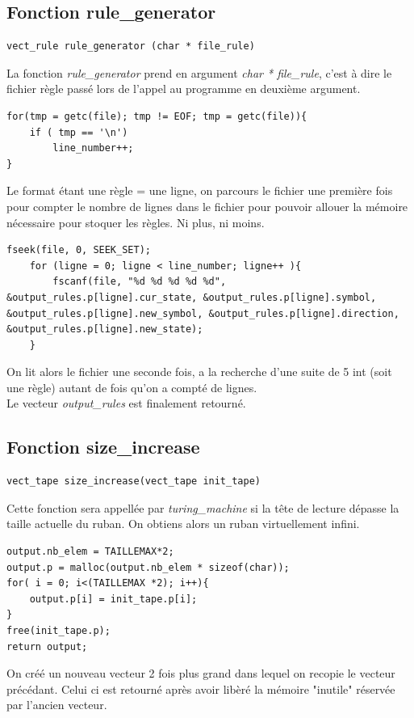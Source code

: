 \documentclass[12pt,a4paper]{report}
\begin{document}
\newpage
\subsection{Fonction rule\_generator}
\begin{verbatim}
vect_rule rule_generator (char * file_rule)
\end{verbatim}
La fonction \textit{rule\_generator} prend en argument \textit{char * file\_rule}, c'est à dire le fichier règle passé lors de l'appel au programme en deuxième argument.\\
\begin{lstlisting}
for(tmp = getc(file); tmp != EOF; tmp = getc(file)){
    if ( tmp == '\n')
        line_number++;
}
\end{lstlisting}
Le format étant une règle = une ligne, on parcours le fichier une première fois pour compter le nombre de lignes dans le fichier pour pouvoir allouer la mémoire nécessaire pour stoquer les règles. Ni plus, ni moins.\\
\begin{lstlisting}
fseek(file, 0, SEEK_SET);
    for (ligne = 0; ligne < line_number; ligne++ ){
        fscanf(file, "%d %d %d %d %d", &output_rules.p[ligne].cur_state, &output_rules.p[ligne].symbol, &output_rules.p[ligne].new_symbol, &output_rules.p[ligne].direction, &output_rules.p[ligne].new_state);
    }
\end{lstlisting}
On lit alors le fichier une seconde fois, a la recherche d'une suite de 5 int (soit une règle) autant de fois qu'on a compté de lignes.\\
Le vecteur \textit{output\_rules} est finalement retourné.



\subsection{Fonction size\_increase}
\begin{verbatim}
vect_tape size_increase(vect_tape init_tape)
\end{verbatim}
Cette fonction sera appellée par \textit{turing\_machine} si la tête de lecture dépasse la taille actuelle du ruban. On obtiens alors un ruban virtuellement infini.\\
\begin{lstlisting}
output.nb_elem = TAILLEMAX*2; 
output.p = malloc(output.nb_elem * sizeof(char));
for( i = 0; i<(TAILLEMAX *2); i++){
    output.p[i] = init_tape.p[i];
}
free(init_tape.p);
return output;
\end{lstlisting}
On créé un nouveau vecteur 2 fois plus grand dans lequel on recopie le vecteur précédant. Celui ci est retourné après avoir libèré la mémoire "inutile" réservée par l'ancien vecteur.
\end{document}
